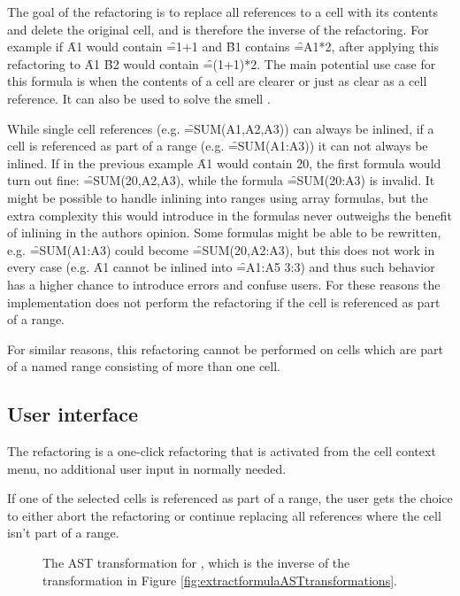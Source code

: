 The goal of the  refactoring is to replace all references to a cell with its contents and delete the original cell, and is therefore the inverse of the  refactoring.
For example if \f{A1} would contain \f{=1+1} and \f{B1} contains \f{=A1*2}, after applying this refactoring to \f{A1} \f{B2} would contain \f{=(1+1)*2}. 
The main potential use case for this formula is when the contents of a cell are clearer or just as clear as a cell reference.
It can also be used to solve the  smell \cite{hermans2014detecting}.

While single cell references (e.g. \f{=SUM(A1,A2,A3)}) can always be inlined, if a cell is referenced as part of a range (e.g. \f{=SUM(A1:A3)}) it can not always be inlined.
If in the previous example \f{A1} would contain \f{20}, the first formula would turn out fine: \f{=SUM(20,A2,A3)}, while the formula \f{=SUM(20:A3)} is invalid.
It might be possible to handle inlining into ranges using array formulas, but the extra complexity this would introduce in the formulas never outweighs the benefit of inlining in the authors opinion.
Some formulas might be able to be rewritten, e.g. \f{=SUM(A1:A3)} could become \f{=SUM(20,A2:A3)}, but this does not work in every case (e.g. \f{A1} cannot be inlined into \f{=A1:A5 3:3}) and thus such behavior has a higher chance to introduce errors and confuse users.
For these reasons the implementation does not perform the refactoring if the cell is referenced as part of a range.

For similar reasons, this refactoring cannot be performed on cells which are part of a named range consisting of more than one cell.

\subsection{User interface}

The refactoring is a one-click refactoring that is activated from the cell context menu, no additional user input in normally needed.

If one of the selected cells is referenced as part of a range, the user gets the choice to either abort the refactoring or continue replacing all references where the cell isn't part of a range.

\begin{figure}
	\centering
	
	\caption{The AST transformation for , which is the inverse of the  transformation in Figure \ref{fig:extractformulaASTtransformations}.}
	\label{fig:inlineformulaAST}
\end{figure}


